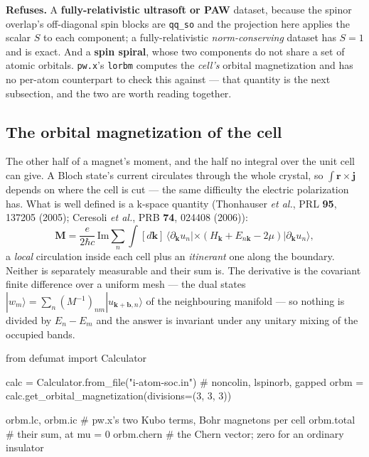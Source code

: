 \documentclass[11pt,a4paper]{article}
\newcommand{\code}[1]{\texttt{\small #1}}
\begin{document}
\begin{refuses}
\textbf{Refuses.} A \textbf{fully-relativistic ultrasoft or
PAW} dataset, because the spinor overlap's off-diagonal spin blocks are
\code{qq\_so} and the projection here applies the scalar $S$ to each component;
a fully-relativistic \emph{norm-conserving} dataset has $S = 1$ and is exact. And
a \textbf{spin spiral}, whose two components do not share a set of atomic
orbitals. \code{pw.x}'s \code{lorbm} computes the \emph{cell's} orbital
magnetization and has no per-atom counterpart to check this against --- that
quantity is the next subsection, and the two are worth reading together.
\end{refuses}

\subsection{The orbital magnetization of the cell}

The other half of a magnet's moment, and the half no integral over the unit cell
can give. A Bloch state's current circulates through the whole crystal, so
$\int \mathbf r \times \mathbf j$ depends on where the cell is cut --- the same
difficulty the electric polarization has. What is well defined is a k-space
quantity (Thonhauser \emph{et al.}, PRL \textbf{95}, 137205 (2005); Ceresoli
\emph{et al.}, PRB \textbf{74}, 024408 (2006)):
\begin{equation*}
  \mathbf M = \frac{e}{2\hbar c}\,\mathrm{Im} \sum_n \int [d\mathbf k]\,
    \langle \partial_{\mathbf k} u_n | \times
      \left( H_{\mathbf k} + E_{n\mathbf k} - 2\mu \right)
    | \partial_{\mathbf k} u_n \rangle,
\end{equation*}
a \emph{local} circulation inside each cell plus an \emph{itinerant} one along
the boundary. Neither is separately measurable and their sum is. The derivative
is the covariant finite difference over a uniform mesh --- the dual states
$|w_m\rangle = \sum_n (M^{-1})_{nm} |u_{\mathbf k + \mathbf b, n}\rangle$ of the
neighbouring manifold --- so nothing is divided by $E_n - E_m$ and the answer is
invariant under any unitary mixing of the occupied bands.

\begin{pycode}
from defumat import Calculator

calc = Calculator.from_file("i-atom-soc.in")    # noncolin, lspinorb, gapped
orbm = calc.get_orbital_magnetization(divisions=(3, 3, 3))

orbm.lc, orbm.ic     # pw.x's two Kubo terms, Bohr magnetons per cell
orbm.total           # their sum, at mu = 0
orbm.chern           # the Chern vector; zero for an ordinary insulator
\end{pycode}
\end{document}

